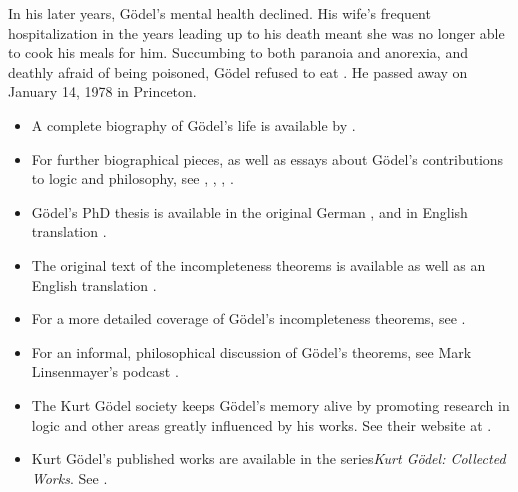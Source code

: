 \documentclass[../../../include/open-logic-section]{subfiles}
\begin{document}
In his later years, G{\"o}del's mental health declined. His wife's frequent
hospitalization in the years leading up to his death meant she was no
longer able to cook his meals for him. Succumbing to both paranoia and
anorexia, and deathly afraid of being poisoned, G{\"o}del refused to eat
\citep[251]{Dawson1997}. He passed away on January 14, 1978 in Princeton.

\begin{reading}
\begin{itemize} 
\item A complete biography of G{\"o}del's life is available
by \citet{Dawson1997}. 

\item For further biographical pieces, as well as
essays about G{\"o}del's contributions to logic and philosophy, see
\citet{Wang1990}, \citet{Baaz2011}, \citet{Takeuti2003}, \citet{Sigmund2007}.

\item G{\"o}del's PhD thesis is available in the original German
\citep{Godel1929}, and in English translation \citep{Godel1986}. 

\item The original text of the incompleteness theorems is available 
\citep{Godel1931} as well as an English translation \citep{Godel1986}. 

\item For a more detailed coverage of G{\"o}del's incompleteness theorems,
 see \citet{Smith2013}. 
 
 \item For an informal, philosophical discussion of G{\"o}del's theorems, 
 see Mark Linsenmayer's podcast \citep{Linsenmayer2014}. 

\item The Kurt G{\"o}del society keeps G{\"o}del's
memory alive by promoting research in logic and other areas greatly
influenced by his works. See their website at \citet{Society2015}.

\item Kurt G{\"o}del's published works are available in the series\emph{Kurt G{\"o}del: 
Collected Works}. See \citet{Godel1986,Godel1990}.

\end{itemize}
\end{reading}
\end{document}
